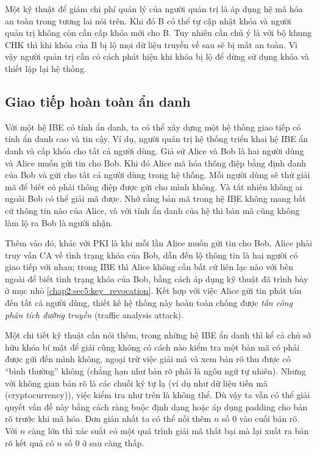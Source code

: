 \documentclass[class=report, crop=false]{standalone}
\begin{document}
			Một kỹ thuật để giảm chi phí quản lý của người quản trị là áp dụng hệ mã hóa an toàn trong tương lai nói trên. Khi đó B có thể tự cập nhật khóa và người quản trị không còn cần cấp khóa mới cho B. Tuy nhiên cần chú ý là với bộ khung CHK thì khi khóa của B bị lộ mọi dữ liệu truyền về sau sẽ bị mất an toàn. Vì vậy người quản trị cần có cách phát hiện khi khóa bị lộ để dừng sử dụng khóa và thiết lập lại hệ thống.
		\subsection{Giao tiếp hoàn toàn ẩn danh}
			Với một hệ IBE có tính ẩn danh, ta có thể xây dựng một hệ thống giao tiếp có tính ẩn danh cao và tin cậy. Ví dụ, người quản trị hệ thống triển khai hệ IBE ẩn danh và cấp khóa cho tất cả người dùng. Giả sử Alice và Bob là hai người dùng và Alice muốn gửi tin cho Bob. Khi đó Alice mã hóa thông điệp bằng định danh của Bob và gửi cho tất cả người dùng trong hệ thống. Mỗi người dùng sẽ thử giải mã để biết có phải thông điệp được gửi cho mình không. Và tất nhiên không ai ngoài Bob có thể giải mã được. Nhớ rằng bản mã trong hệ IBE không mang bất cứ thông tin nào của Alice, và với tính ẩn danh của hệ thì bản mã cũng không làm lộ ra Bob là người nhận.
			
			Thêm vào đó, khác với PKI là khi mỗi lần Alice muốn gửi tin cho Bob, Alice phải truy vấn CA về tình trạng khóa của Bob, dẫn đến lộ thông tin là hai người có giao tiếp với nhau; trong IBE thì Alice không cần bất cứ liên lạc nào với bên ngoài để biết tình trạng khóa của Bob, bằng cách áp dụng kỹ thuật đã trình bày ở mục nhỏ \ref{chap2:sec5:key_revocation}. Kết hợp với việc Alice gửi tin phát tán đến tất cả người dùng, thiết kế hệ thống này hoàn toàn chống được \textit{tấn công phân tích đường truyền} (traffic analysis attack).

			Một chi tiết kỹ thuật cần nói thêm, trong những hệ IBE ẩn danh thì kể cả chủ sở hữu khóa bí mật để giải cũng không có cách nào kiểm tra một bản mã có phải được gửi đến mình không, ngoại trừ việc giải mã và xem bản rõ thu được có ``bình thường'' không (chẳng hạn như bản rõ phải là ngôn ngữ tự nhiên). Nhưng với không gian bản rõ là các chuỗi ký tự lạ (ví dụ như dữ liệu tiền mã (cryptocurrency)), việc kiểm tra như trên là không thể. Dù vậy ta vẫn có thể giải quyết vấn đề này bằng cách ràng buộc định dạng hoặc áp dụng padding cho bản rõ trước khi mã hóa. Đơn giản nhất ta có thể nối thêm $n$ số 0 vào cuối bản rõ. Với $n$ càng lớn thì xác suất có một quá trình giải mã thất bại mà lại xuất ra bản rõ kết quả có $n$ số 0 ở sau càng thấp.
\end{document}

